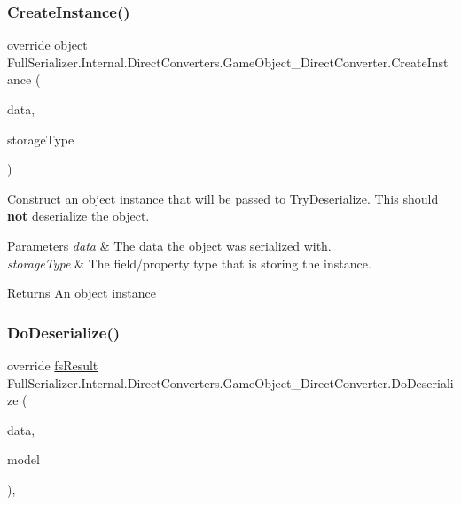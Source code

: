 \subsubsection{\texorpdfstring{Create\+Instance()}{CreateInstance()}}
{\footnotesize\ttfamily override object Full\+Serializer.\+Internal.\+Direct\+Converters.\+Game\+Object\+\_\+\+Direct\+Converter.\+Create\+Instance (\begin{DoxyParamCaption}\item[{\hyperlink{class_full_serializer_1_1fs_data}{fs\+Data}}]{data,  }\item[{Type}]{storage\+Type }\end{DoxyParamCaption})\hspace{0.3cm}{\ttfamily [inline]}}



Construct an object instance that will be passed to Try\+Deserialize. This should {\bfseries not} deserialize the object. 


\begin{DoxyParams}{Parameters}
{\em data} & The data the object was serialized with.\\
\hline
{\em storage\+Type} & The field/property type that is storing the instance.\\
\hline
\end{DoxyParams}
\begin{DoxyReturn}{Returns}
An object instance
\end{DoxyReturn}
\mbox{\label{class_full_serializer_1_1_internal_1_1_direct_converters_1_1_game_object___direct_converter_a93134c0f0b5c7d7cdc2449541f031bf3}} 
\subsubsection{\texorpdfstring{Do\+Deserialize()}{DoDeserialize()}}
{\footnotesize\ttfamily override \hyperlink{struct_full_serializer_1_1fs_result}{fs\+Result} Full\+Serializer.\+Internal.\+Direct\+Converters.\+Game\+Object\+\_\+\+Direct\+Converter.\+Do\+Deserialize (\begin{DoxyParamCaption}\item[{Dictionary$<$ string, \hyperlink{class_full_serializer_1_1fs_data}{fs\+Data} $>$}]{data,  }\item[{ref Game\+Object}]{model }\end{DoxyParamCaption})\hspace{0.3cm}{\ttfamily [inline]}, {\ttfamily [protected]}}



